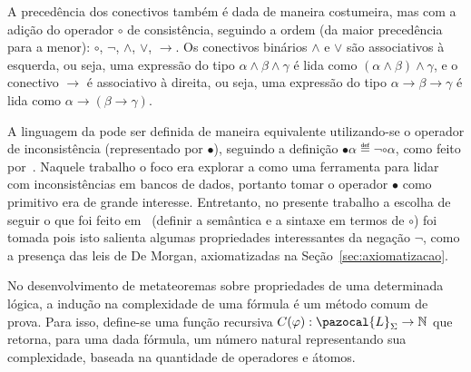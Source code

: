 A precedência dos conectivos também é dada de maneira costumeira, mas com a adição do operador $\circ$ de consistência, seguindo a ordem (da maior precedência para a menor): $\circ$, $\neg$, $\land$, $\lor$, $\rightarrow$. Os conectivos binários $\land$ e $\lor$ são associativos à esquerda, ou seja, uma expressão do tipo $\alpha \land \beta \land \gamma$ é lida como $(\alpha \land \beta) \land \gamma$, e o conectivo $\rightarrow$ é associativo à direita, ou seja, uma expressão do tipo $\alpha \rightarrow \beta \rightarrow \gamma$ é lida como $\alpha \rightarrow (\beta \rightarrow \gamma)$.

A linguagem da \lfium{} pode ser definida de maneira equivalente utilizando-se o operador de inconsistência (representado por $\bullet$), seguindo a definição $\bullet \alpha \eqdef \neg \circ \alpha$, como feito por~. Naquele trabalho o foco era explorar a \lfium{} como uma ferramenta para lidar com inconsistências em bancos de dados, portanto tomar o operador $\bullet$ como primitivo era de grande interesse. Entretanto, no presente trabalho a escolha de seguir o que foi feito em~\cite{Carnielli_Coniglio_2016} (definir a semântica e a sintaxe em termos de $\circ$) foi tomada pois isto salienta algumas propriedades interessantes da negação $\neg$, como a presença das leis de De Morgan, axiomatizadas na Seção~\ref{sec:axiomatizacao}.


No desenvolvimento de metateoremas sobre propriedades de uma determinada lógica, a indução na complexidade de uma fórmula é um método comum de prova. Para isso, define-se uma função recursiva $C(\phi) : \pazocal{L}_{\Sigma} \rightarrow \mathbb{N}$ que retorna, para uma dada fórmula, um número natural representando sua complexidade, baseada na quantidade de operadores e átomos.

